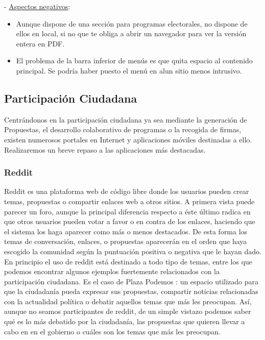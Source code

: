  - \underline{Aspectos negativos}:

\begin{itemize}
	\item Aunque dispone de una sección para programas electorales, no dispone de ellos en local, si no que te obliga a abrir un navegador para ver la versión entera en PDF.
	\item El problema de la barra inferior de menús es que quita espacio al contenido principal. Se podría haber puesto el menú en alun sitio menos intrusivo.
\end{itemize}

\subsection{Participación Ciudadana} \label{ssec:artProposals}

Centrándonos en la participación ciudadana ya sea mediante la generación de Propuestas, el desarrollo colaborativo de programas o la recogida de firmas, existen numerosos portales en Internet y aplicaciones móviles destinadas a ello. Realizaremos un breve repaso a las aplicaciones más destacadas.

\subsubsection{Reddit}

Reddit \cite{ref:reddit} es una plataforma web de código libre donde los usuarios pueden crear temas, propuestas o compartir enlaces web a otros sitios. A primera vista puede parecer un foro, aunque la principal diferencia respecto a éste último radica en que otros usuarios pueden votar a favor o en contra de los enlaces, haciendo que el sistema los haga aparecer como más o menos destacados. De esta forma los temas de conversación, enlaces, o propuestas aparecerán en el orden que haya escogido la comunidad según la puntuación positiva o negativa que le hayan dado.
En principio el uso de reddit está destinado a todo tipo de temas, entre los que podemos encontrar algunos ejemplos fuertemente relacionados con la participación ciudadana. Es el caso de Plaza Podemos \cite{ref:plazaPodemos}: un espacio utilizado para que la ciudadanía pueda expresar sus propuestas, compartir noticias relacionadas con la actualidad política o debatir aquellos temas que más les preocupan. Así, aunque no seamos participantes de reddit, de un simple vistazo podemos saber qué es lo más debatido por la ciudadanía, las propuestas que quieren llevar a cabo en en el gobierno o cuáles son los temas que más les preocupan.

